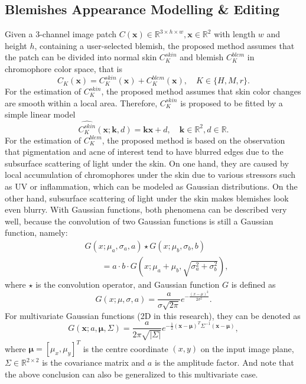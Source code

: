 \begin{spacing}{1.5}
\section{Blemishes Appearance Modelling \& Editing}
Given a 3-channel image patch $C(\mathbf{x})\in\mathbb{R}^{3\times h\times w}, \mathbf{x}\in\mathbb{R}^2$ with length $w$ and height $h$, containing a user-selected blemish, the proposed method assumes that the patch can be divided into normal skin $C_K^{skin}$ and blemish $C_K^{blem}$ in chromophore color space, that is
\begin{equation}
  C_K(\mathbf{x}) = C_K^{skin}(\mathbf{x}) + C_K^{blem}(\mathbf{x}),\quad K\in\{H,M,r\}.
\end{equation}
For the estimation of $C_K^{skin}$, the proposed method assumes that skin color changes are smooth within a local area. Therefore, $C_K^{skin}$ is proposed to be fitted by a simple linear model
\begin{equation}
  \hat{C_K^{skin}}(\mathbf{x};\mathbf{k},d)=\mathbf{k}\mathbf{x}+d,\quad\mathbf{k}\in\mathbb{R}^2, d\in\mathbb{R}.
\end{equation}
For the estimation of $C_K^{blem}$, the proposed method is based on the observation that pigmentation and acne of interest tend to have blurred edges due to the subsurface scattering of light under the skin. On one hand, they are caused by local accumulation of chromophores under the skin due to various stressors such as UV or inflammation, which can be modeled as Gaussian distributions. On the other hand, subsurface scattering of light under the skin makes blemishes look even blurry. With Gaussian functions, both phenomena can be described very well, because the convolution of two Gaussian functions is still a Gaussian function, namely:
\begin{equation}
    \begin{aligned}
         & G(x; \mu_a, \sigma_a, a)\star G(x; \mu_b, \sigma_b, b)                 \\
         & \qquad= a\cdot b\cdot G(x; \mu_a+\mu_b, \sqrt{\sigma_a^2+\sigma_b^2}),
    \end{aligned}
\end{equation}
where $\star$ is the convolution operator, and Gaussian function $G$ is defined as
\begin{equation}
    G(x; \mu, \sigma, a) = \frac{a}{\sigma\sqrt{2\pi}}e^{-\frac{{(x - \mu)^2}}{{2\sigma^2}}}.
\end{equation}
For multivariate Gaussian functions (2D in this research), they can be denoted as
\begin{equation}
    G(\mathbf{x}; a, \mathbf{\mu}, \Sigma)=\frac{a}{2\pi\sqrt{|\Sigma|}}e^{-\frac{1}{2}(\mathbf{x}-\mathbf{\mu})^T\Sigma^{-1}(\mathbf{x}-\mathbf{\mu})},
  \end{equation}
where $\mathbf{\mu}=[\mu_x,\mu_y]^T$ is the centre coordinate $(x,y)$ on the input image plane, $\Sigma\in\mathbb{R}^{2\times2}$ is the covariance matrix and $a$ is the amplitude factor. And note that the above conclusion can also be generalized to this multivariate case.


\end{spacing}
